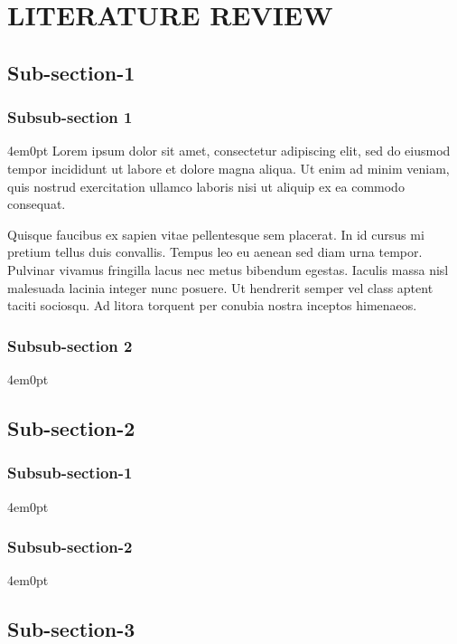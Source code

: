 \renewcommand{\thechapter}{\Roman{chapter}}
\chapter[]{LITERATURE REVIEW}
\renewcommand{\thechapter}{\arabic{chapter}}

\addimage

\section{Sub-section-1}

	\subsection{Subsub-section 1}
		\begin{indentedblock}{4em}{0pt}
			Lorem ipsum dolor sit amet, consectetur adipiscing elit, sed do eiusmod tempor incididunt ut labore et dolore magna aliqua. Ut enim ad minim veniam, quis nostrud exercitation ullamco laboris nisi ut aliquip ex ea commodo consequat. 
			
			
			Quisque faucibus ex sapien vitae pellentesque sem placerat. In id cursus mi pretium tellus duis convallis. Tempus leo eu aenean sed diam urna tempor. Pulvinar vivamus fringilla lacus nec metus bibendum egestas. Iaculis massa nisl malesuada lacinia integer nunc posuere. Ut hendrerit semper vel class aptent taciti sociosqu. Ad litora torquent per conubia nostra inceptos himenaeos.
		\end{indentedblock}
	\subsection{Subsub-section 2}
		\begin{indentedblock}{4em}{0pt}
		\end{indentedblock}
\section{Sub-section-2}

	\subsection{Subsub-section-1}
		\begin{indentedblock}{4em}{0pt}
		\end{indentedblock}
	\subsection{Subsub-section-2}
		\begin{indentedblock}{4em}{0pt}
		\end{indentedblock}
\section{Sub-section-3}
